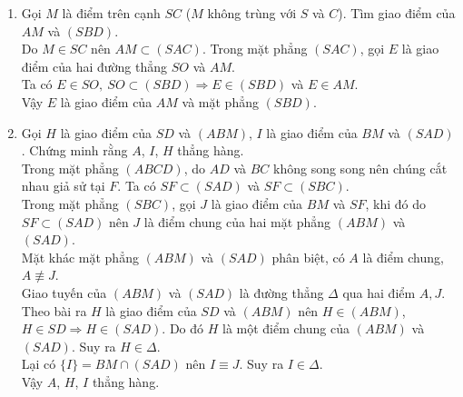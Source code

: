 \begin{bt}
{\begin{enumerate}
			Vậy $(SAC) \cap (SBD)=SO$.
			\item Gọi $M$ là điểm trên cạnh $SC$ ($M$ không trùng với $S$ và $C$). Tìm giao điểm của $AM$ và $(SBD)$.\\
			Do $M \in SC$ nên $AM \subset (SAC)$. Trong mặt phẳng $(SAC)$, gọi $E$ là giao điểm của hai đường thẳng $SO$ và $AM$.\\
			Ta có $E \in SO,\ SO \subset (SBD) \Rightarrow E \in (SBD)$ và $E \in AM$.\\
			Vậy $E$ là giao điểm của $AM$ và mặt phẳng $(SBD)$.
			\item Gọi $H$ là giao điểm của $SD$ và $(ABM)$, $I$ là giao điểm của $BM$ và $(SAD)$. Chứng minh rằng $A$, $I$, $H$ thẳng hàng.\\
			Trong mặt phẳng $(ABCD)$, do $AD$ và $BC$ không song song nên chúng cắt nhau giả sử tại $F$. Ta có $SF \subset(SAD)$ và $SF \subset (SBC)$.\\
			Trong mặt phẳng $(SBC)$, gọi $J$ là giao điểm của $BM$ và $SF$, khi đó do $SF \subset (SAD)$ nên $J$ là điểm chung của hai mặt phẳng $(ABM)$ và $(SAD)$.\\
			Mặt khác mặt phẳng $(ABM)$ và $(SAD)$ phân biệt, có $A$ là điểm chung, $A \not\equiv J$.\\
			Giao tuyến của $(ABM)$ và $(SAD)$ là đường thẳng $\Delta$ qua hai điểm $A, J$.\\
			Theo bài ra $H$ là giao điểm của $SD$ và $(ABM)$ nên $H \in (ABM)$, $H \in SD \Rightarrow H \in (SAD)$. Do đó $H$ là một điểm chung của $(ABM)$ và $(SAD)$. Suy ra $H \in \Delta$.\\
			Lại có $\{I\}=BM \cap (SAD)$ nên $I \equiv J$. Suy ra $I \in \Delta$.\\
			Vậy $A$, $H$, $I$ thẳng hàng.
		\end{enumerate}			
	}
\end{bt}
